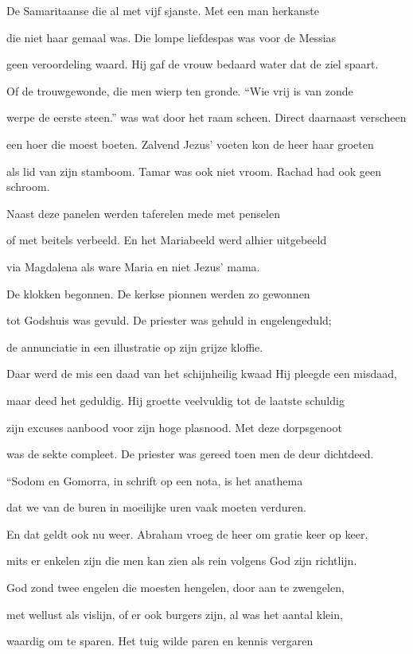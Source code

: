 De Samaritaanse
die al met vijf sjanste.
Met een man herkanste

die niet haar gemaal was.
Die lompe liefdespas was
voor de Messias

geen veroordeling waard.
Hij gaf de vrouw bedaard
water dat de ziel spaart.

Of de trouwgewonde,
die men wierp ten gronde.
“Wie vrij is van zonde

werpe de eerste steen.”
was wat door het raam scheen.
Direct daarnaast verscheen

een hoer die moest boeten.
Zalvend Jezus’ voeten
kon de heer haar groeten

als lid van zijn stamboom.
Tamar was ook niet vroom.
Rachad had ook geen schroom.

Naast deze panelen
werden taferelen
mede met penselen

of met beitels verbeeld.
En het Mariabeeld
werd alhier uitgebeeld

via Magdalena
als ware Maria
en niet Jezus’ mama.

De klokken begonnen.
De kerkse pionnen
werden zo gewonnen

tot Godshuis was gevuld.
De priester was gehuld
in engelengeduld;

de annunciatie
in een illustratie
op zijn grijze kloffie.

Daar werd de mis een daad
van het schijnheilig kwaad
Hij pleegde een misdaad,

maar deed het geduldig.
Hij groette veelvuldig
tot de laatste schuldig

zijn excuses aanbood
voor zijn hoge plasnood.
Met deze dorpsgenoot

was de sekte compleet.
De priester was gereed
toen men de deur dichtdeed.

“Sodom en Gomorra,
in schrift op een nota,
is het anathema

dat we van de buren
in moeilijke uren
vaak moeten verduren.

En dat geldt ook nu weer.
Abraham vroeg de heer
om gratie keer op keer,

mits er enkelen zijn
die men kan zien als rein
volgens God zijn richtlijn.

God zond twee engelen
die moesten hengelen,
door aan te zwengelen,

met wellust als vislijn,
of er ook burgers zijn,
al was het aantal klein,

waardig om te sparen.
Het tuig wilde paren
en kennis vergaren

